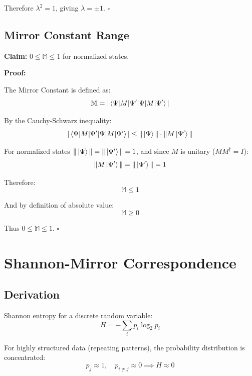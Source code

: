 \documentclass[12pt,a4paper]{article}
\begin{document}
Therefore $\lambda^2 = 1$, giving $\lambda = \pm 1$. $\square$

\subsection{Mirror Constant Range}

\textbf{Claim:} $0 \leq \mathbb{M} \leq 1$ for normalized states.

\textbf{Proof:}

The Mirror Constant is defined as:
\begin{equation}
\mathbb{M} = |\braket{\Psi|M|\Psi'}|
\end{equation}

By the Cauchy-Schwarz inequality:
\begin{equation}
|\braket{\Psi|M|\Psi'}| \leq \|\ket{\Psi}\| \cdot \|M\ket{\Psi'}\|
\end{equation}

For normalized states $\|\ket{\Psi}\| = \|\ket{\Psi'}\| = 1$, and since $M$ is unitary ($MM^\dagger = I$):
\begin{equation}
\|M\ket{\Psi'}\| = \|\ket{\Psi'}\| = 1
\end{equation}

Therefore:
\begin{equation}
\mathbb{M} \leq 1
\end{equation}

And by definition of absolute value:
\begin{equation}
\mathbb{M} \geq 0
\end{equation}

Thus $0 \leq \mathbb{M} \leq 1$. $\square$

\section{Shannon-Mirror Correspondence}

\subsection{Derivation}

Shannon entropy for a discrete random variable:
\begin{equation}
H = -\sum_{i} p_i \log_2 p_i
\end{equation}

For highly structured data (repeating patterns), the probability distribution is concentrated:
\begin{equation}
p_j \approx 1, \quad p_{i \neq j} \approx 0 \implies H \approx 0
\end{equation}
\end{document}
